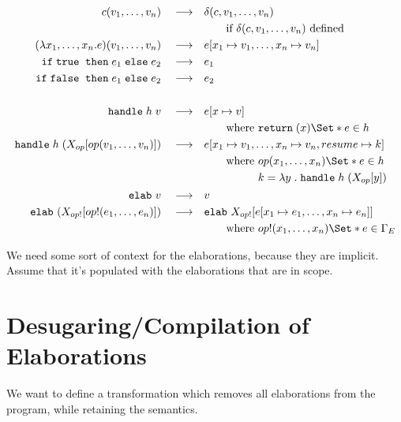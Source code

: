 \documentclass{article}
\newcommand\kw[1]{\mathbf{\mathtt{#1}}\;}
\newcommand\true{\kw{true}}
\newcommand\false{\kw{false}}
\newcommand\return[0]{\kw{return}}
\newcommand\cond[3]{\kw{if} #1\;\kw{then} #2\;\kw{else} #3}
\newcommand\handle[2]{\kw{handle} #1\;#2}
\newcommand\elab[2][]{\kw{elab_{#1}}#2}
\newcommand\f[2]{\lambda #1\;.\;#2}
\renewcommand\S{\Set*}
\begin{document}
\newcommand{\reduce}{\quad\longrightarrow\quad}
\begin{align*}
    c(v_1, \dots, v_n) \reduce& \delta(c, v_1, \dots, v_n) \\
    &\qquad\text{if } \delta(c, v_1, \dots, v_n) \text{ defined}\\
    (\lambda x_1, \dots, x_n . e) (v_1, \dots, v_n) \reduce& e[x_1 \mapsto v_1, \dots, x_n \mapsto v_n] \\
    \cond{\true}{e_1}{e_2} \reduce& e_1 \\
    \cond{\false}{e_1}{e_2} \reduce& e_2 \\
    \\
    \handle{h}{v} \reduce& e[x\mapsto v] \\
    &\qquad\text{where } \return(x) \S{ e } \in h\\
    \handle{h}{(X_{op}[op(v_1, \dots, v_n)])} \reduce& e[x_1\mapsto v_1, \dots, x_n\mapsto v_n, resume \mapsto k] \\
    &\qquad \text{where } \begin{aligned}[t]
        & op(x_1, \dots, x_n) \S{e} \in h\\
        & k = \f{y}{\handle h (X_{op}[y])}
    \end{aligned}\\
    \elab v \reduce& v\\
    \elab (X_{op!}[op!(e_1, \dots, e_n)]) \reduce& \elab X_{op!}[e[x_1 \mapsto e_1, \dots, x_n \mapsto e_n]] \\
    &\qquad \text{where } op!(x_1, \dots, x_n) \S{e} \in \Gamma_E \\
\end{align*}

We need some sort of context for the elaborations, because they are implicit. Assume that it's populated with the elaborations that are in scope.

\section{Desugaring/Compilation of Elaborations}

We want to define a transformation which removes all elaborations from the program, while retaining the semantics.
\end{document}
